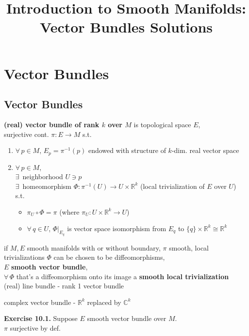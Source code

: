 \documentclass[11pt]{amsart}
\title{Introduction to Smooth Manifolds: Vector Bundles Solutions}
\theoremstyle{definition}
\newcommand{\exercisehead}[1]{\medskip\noindent\textbf{Exercise #1.} }
\begin{document}
\maketitle
\section{Vector Bundles }

\subsection*{Vector Bundles }

\textbf{ (real) vector bundle of rank $k$ over $M$ } is topological space $E$, \\
\quad surjective cont. $\pi: E \to M$ s.t.
\begin{enumerate}
\item[(i)] $\forall \, p \in M$, $E_p = \pi^{-1}(p)$ endowed with structure of $k$-dim. real vector space
\item[(ii)] $\forall \, p \in M$, \\
  $\exists \, $ neighborhood $U \ni p$ \\
  $ \exists \, $ homeomorphism $\Phi : \pi^{-1}{(U)} \to U \times \mathbb{R}^k$ (local trivialization of $E$ over $U$) \\

s.t.

\begin{itemize}
\item $\pi_U \circ \Phi = \pi$ (where $\pi_U : U \times \mathbb{R}^k \to U$)
\item $\forall \, q\in U$, $\left. \Phi \right|_{E_q}$ is vector space isomorphism from $E_q$ to $\lbrace q \rbrace \times \mathbb{R}^k \cong \mathbb{R}^k$
\end{itemize}
\end{enumerate}

if $M, E$ smooth manifolds with or without boundary, $\pi$ smooth, local trivializations $\Phi$ can be chosen to be diffeomorphisms, \\
$E$ \textbf{smooth vector bundle}, \\
$\forall \, \Phi$ that's a diffeomorphism onto its image a \textbf{ smooth local trivialization} \\

(real) line bundle - rank 1 vector bundle

complex vector bundle - $\mathbb{R}^k$ replaced by $\mathbb{C}^k$

\exercisehead{10.1} Suppose $E$ smooth vector bundle over $M$. \\
$\pi$ surjective by def.
\end{document}
